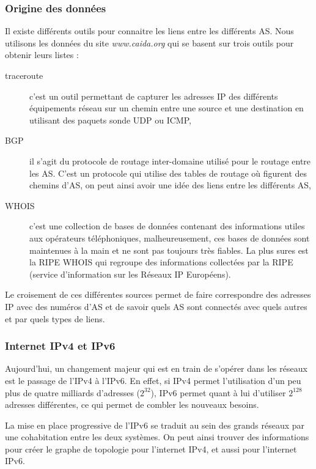 \subsubsection{Origine des donn\'ees}
\par
Il existe diff\'erents outils pour connaitre les liens entre les diff\'erents AS. Nous utilisons les donn\'ees du site \textit{www.caida.org} qui se basent sur trois outils pour obtenir leurs listes :
\begin{description}
 \item[traceroute] c'est un outil permettant de capturer les adresses IP des diff\'erents \'equipements r\'eseau sur un chemin entre une source et une destination en utilisant des paquets sonde UDP ou ICMP,
 \item[BGP] il s'agit du protocole de routage inter-domaine utilis\'e pour le routage entre les AS. C'est un protocole qui utilise des tables de routage o\`u figurent des chemins d'AS, on peut ainsi avoir une idée des liens entre les diff\'erents AS,
 \item[WHOIS] c'est une collection de bases de donn\'ees contenant des informations utiles aux op\'erateurs t\'el\'ephoniques, malheureusement, ces bases de donn\'ees sont maintenues \`a la main et ne sont pas toujours tr\`es fiables. La plus sures est la RIPE WHOIS qui regroupe des informations collect\'ees par la RIPE (service d'information sur les R\'eseaux IP Europ\'eens).
\end{description}
\par
Le croisement de ces diff\'erentes sources permet de faire correspondre des adresses IP avec des num\'eros d'AS et de savoir quels AS sont connect\'es avec quels autres et par quels types de liens.

\subsubsection{Internet IPv4 et IPv6}
\par
Aujourd'hui, un changement majeur qui est en train de s'op\'erer dans les r\'eseaux est le passage de l'IPv4 \`a l'IPv6. En effet, si IPv4 permet l'utilisation d'un peu plus de quatre milliards d'adresses ($2^32$), IPv6 permet quant \`a lui d'utiliser $2^128$ adresses diff\'erentes, ce qui permet de combler les nouveaux besoins.
\par
La mise en place progressive de l'IPv6 se traduit au sein des grands r\'eseaux par une cohabitation entre les deux syst\`emes. On peut ainsi trouver des informations pour cr\'eer le graphe de topologie pour l'internet IPv4, et aussi pour l'internet IPv6.


% 
